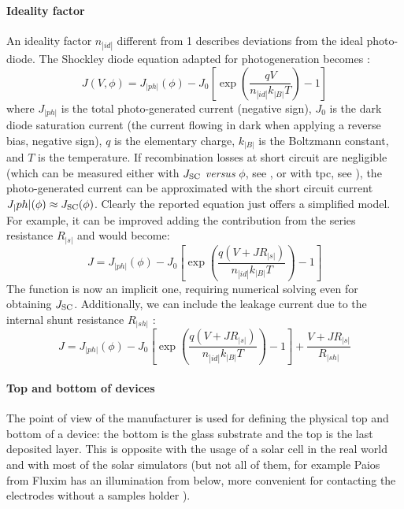 		\paragraph{Ideality factor} An ideality factor $n_|id|$ different from 1 describes deviations from the ideal photo-diode.
		The Shockley diode equation adapted for photogeneration becomes \cite{Calado2018b}:
		\begin{equation} \label{eq:photodiode}
			J(V,\phi) = J_|ph|(\phi) - J_0\left[\exp(\frac{qV}{n_|id|k_|B|T})-1\right]
		\end{equation}
		where $J_|ph|$ is the total photo-generated current (negative sign), $J_0$ is the dark diode saturation current (the current flowing in dark when applying a reverse bias, negative sign), $q$ is the elementary charge, $k_|B|$ is the Boltzmann constant, and $T$ is the temperature.
		If recombination losses at short circuit are negligible (which can be measured either with $J_\mathrm{SC}$ \textsl{versus} $\phi$, see , or with \gls{tpc}, see ), the photo-generated current can be approximated with the short circuit current $J_|ph|(\phi) \approx J_\mathrm{SC}(\phi)$.
		Clearly the reported equation just offers a simplified model.
		For example, it can be improved adding the contribution from the series resistance $R_|s|$ and would become:
		\begin{equation}
		J = J_|ph|(\phi) - J_0\left[\exp(\frac{q(V+JR_|s|)}{n_|id|k_|B|T})-1\right]
		\end{equation}
		The function is now an implicit one, requiring numerical solving even for obtaining $J_\mathrm{SC}$.
		Additionally, we can include the leakage current due to the internal shunt resistance $R_|sh|$ \cite{Nelson2003}:
		\begin{equation}
		J = J_|ph|(\phi) - J_0\left[\exp(\frac{q(V+JR_|s|)}{n_|id|k_|B|T})-1\right] + \frac{V+JR_|s|}{R_|sh|}
		\end{equation}
		
		\paragraph{Top and bottom of devices} The point of view of the manufacturer is used for defining the physical top and bottom of a device: the bottom is the glass substrate and the top is the last deposited layer.
		This is opposite with the usage of a solar cell in the real world and with most of the solar simulators (but not all of them, for example Paios from Fluxim has an illumination from below, more convenient for contacting the electrodes without a samples holder \cite{Fluxim}).

